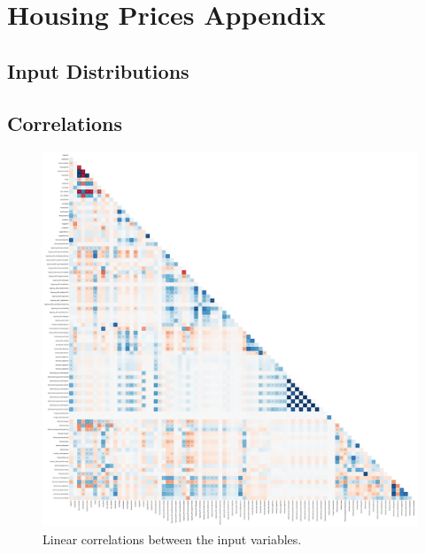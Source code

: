 
\chapter{Housing Prices Appendix}

\section{Input Distributions}



\FloatBarrier
\section{Correlations}

\begin{figure}[h!]
  \centerfloat
  \includegraphics[draft=false, width=1.1\textwidth, trim=10 10 10 10, clip]{figures/housing/correlations_all.pdf}
  \caption[Linear Correlations]
          {Linear correlations between the input variables.}
  \label{fig:h:correlations_all_lin}
\end{figure}


